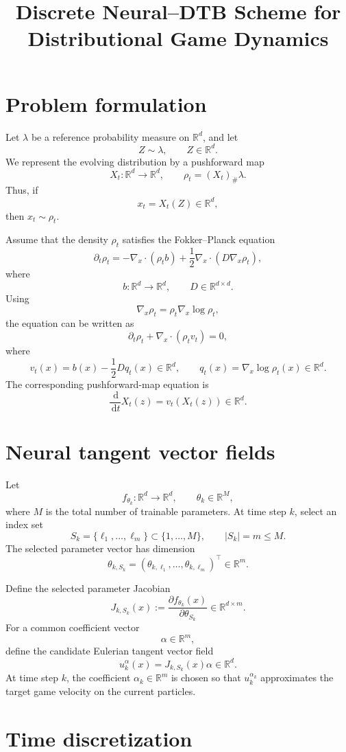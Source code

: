 \documentclass[11pt]{article}
\title{Discrete Neural--DTB Scheme for Distributional Game Dynamics}
\author{}
\date{}
\newcommand{\R}{\mathbb{R}}
\newcommand{\dd}{\,\mathrm{d}}
\begin{document}
\maketitle

\section{Problem formulation}

Let $\lambda$ be a reference probability measure on $\R^d$, and let
\[
Z\sim\lambda,
\qquad Z\in\R^d.
\]
We represent the evolving distribution by a pushforward map
\[
X_t:\R^d\to\R^d,
\qquad
\rho_t=(X_t)_{\#}\lambda.
\]
Thus, if
\[
x_t=X_t(Z)\in\R^d,
\]
then $x_t\sim\rho_t$.

Assume that the density $\rho_t$ satisfies the Fokker--Planck equation
\[
\partial_t\rho_t
=
-\nabla_x\cdot(\rho_t b)
+
\frac12\nabla_x\cdot(D\nabla_x\rho_t),
\]
where
\[
b:\R^d\to\R^d,
\qquad
D\in\R^{d\times d}.
\]
Using
\[
\nabla_x\rho_t
=
\rho_t\nabla_x\log\rho_t,
\]
the equation can be written as
\[
\partial_t\rho_t+\nabla_x\cdot(\rho_t v_t)=0,
\]
where
\[
\boxed{
v_t(x)=b(x)-\frac12Dq_t(x)\in\R^d,
}
\qquad
\boxed{
q_t(x)=\nabla_x\log\rho_t(x)\in\R^d.
}
\]
The corresponding pushforward-map equation is
\[
\boxed{
\frac{\dd}{\dd t}X_t(z)=v_t(X_t(z))\in\R^d.
}
\]

\section{Neural tangent vector fields}

Let
\[
f_{\theta_k}:\R^d\to\R^d,
\qquad
\theta_k\in\R^M,
\]
where $M$ is the total number of trainable parameters. At time step $k$, select an index set
\[
S_k=\{\ell_1,\ldots,\ell_m\}\subset\{1,\ldots,M\},
\qquad
|S_k|=m\leq M.
\]
The selected parameter vector has dimension
\[
\theta_{k,S_k}
=
(\theta_{k,\ell_1},\ldots,\theta_{k,\ell_m})^\top
\in\R^m.
\]

Define the selected parameter Jacobian
\[
\boxed{
J_{k,S_k}(x)
:=
\frac{\partial f_{\theta_k}(x)}{\partial\theta_{S_k}}
\in\R^{d\times m}.
}
\]
For a common coefficient vector
\[
\alpha\in\R^m,
\]
define the candidate Eulerian tangent vector field
\[
\boxed{
u_k^\alpha(x)=J_{k,S_k}(x)\alpha\in\R^d.
}
\]
At time step $k$, the coefficient $\alpha_k\in\R^m$ is chosen so that $u_k^{\alpha_k}$ approximates the target game velocity on the current particles.

\section{Time discretization}
\end{document}
